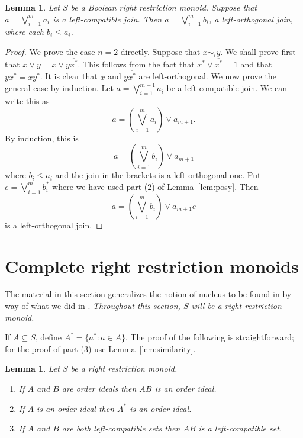 \documentclass[a4paper]{amsart}
\newtheorem{lemma}[theorem]{Lemma}
\begin{document}
\begin{lemma}\label{lem:left-orthogonal} 
Let $S$ be a Boolean right restriction monoid.
Suppose that $a = \bigvee_{i=1}^{m} a_{i}$ is a left-compatible join.
Then $a = \bigvee_{i=1}^{m} b_{i}$, a left-orthogonal join, where each $b_{i} \leq a_{i}$.
\end{lemma}
\begin{proof} We prove the case $n = 2$ directly.
Suppose that $x \sim_{l} y$.
We shall prove first that $x \vee y = x \vee y\overline{x^{\ast}}$.
This follows from the fact that $x^{\ast} \vee \overline{x^\ast} = 1$
and that $yx^{\ast} = xy^{\ast}$.
It is clear that $x$ and $y \overline{x^{\ast}}$ are left-orthogonal.
We now prove the general case by induction.
Let $a = \bigvee_{i=1}^{m+1} a_{i}$ be a left-compatible join.
We can write this as
$$a = \left( \bigvee_{i=1}^{m} a_{i} \right) \vee a_{m+1}.$$ 
By induction, this is
$$a = \left( \bigvee_{i=1}^{m} b_{i} \right) \vee a_{m+1}$$ 
where $b_{i} \leq a_{i}$ and the join in the brackets
is a left-orthogonal one.
Put $e = \bigvee_{i=1}^{m} b_{i}^{\ast}$
where we have used part (2) of Lemma~\ref{lem:posy}.
Then
$$a = \left( \bigvee_{i=1}^{m} b_{i} \right) \vee a_{m+1}\overline{e}$$ 
is a left-orthogonal join.
\end{proof}





\section{Complete right restriction monoids}

The material in this section generalizes the notion of nucleus to be found in \cite[Chapter II, Section 2]{J} by way of what we did
in \cite[Section 4]{LL}.
{\em Throughout this section, $S$ will be a right restriction monoid.}

If $A \subseteq S$, define $A^{\ast} = \{a^{\ast} \colon a \in A\}$.
The proof of the following is straightforward; for the proof of part (3) use Lemma~\ref{lem:similarity}.

\begin{lemma}\label{lem:gervais} 
Let $S$ be a right restriction monoid.
\begin{enumerate}
\item If $A$ and $B$ are order ideals then $AB$ is an order ideal.
\item If $A$ is an order ideal then $A^{\ast}$ is an order ideal.
\item If $A$ and $B$ are both left-compatible sets then $AB$ is a left-compatible set.
\end{enumerate}
\end{lemma}
\end{document}
